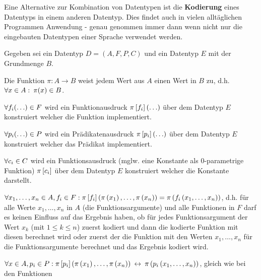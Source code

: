{\begin{comment}
\[\I{E}{\delta,\omega'}{nth(x,y)} = \ebr{}\]
Was das geforderte Ergebnis für diesen Fall ist.
\item Fall $\abs{\omega'(\tu{x})} \geq \omega'(\tu{y})$:
\[\I{E}{\delta,\omega'}{nth(x,y)} = \ell'_{\omega'(\tu{y})} = \ell'_{n} = \ell_{n+1}\]
Was ebenfalls das geforderte Ergebnis für diesen Fall ist.
\end{\whichitem}
\end{\whichitem}
Damit ist der Beweis erbracht. Wir stellen fest, dass Beweise von $\lng{E}$-Programmen oft kürzer sind als
die Interpretation für einen bestimmten Eingabewert.
\end{bsp}
\ifthenelse{\boolean{long}}{}{\end{comment}}

Eine Alternative zur Kombination von Datentypen ist die \textbf{Kodierung} eines Datentyps in einem anderen Datentyp.
Dies findet auch in vielen alltäglichen Programmen Anwendung - genau genommen immer dann wenn nicht nur die eingebauten Datentypen einer Sprache verwendet werden.

\begin{defn}
Gegeben sei ein Datentyp $D=(A,F,P,C)$ und ein Datentyp $E$ mit der Grundmenge $B$.
\begin{\whichitem}
\item Die Funktion $\pi: A \to B$ weist jedem Wert aus $A$ einen Wert in $B$ zu, d.h. $\text{$\forall$} x \in A: \: \pi(x) \in B$.
\item $\text{$\forall$} f_i(\ldots) \in F$ wird ein Funktionausdruck $\pi\left[f_i\right](\ldots)$ über dem Datentyp $E$ konstruiert welcher die Funktion implementiert.
\item $\text{$\forall$} p_i(\ldots) \in P$ wird ein Prädikatenausdruck $\pi\left[p_i\right](\ldots)$ über dem Datentyp $E$ konstruiert welcher das Prädikat implementiert.
\item $\text{$\forall$} c_i \in C$ wird ein Funktionsausdruck (mglw. eine Konstante als 0-parametrige Funktion) $\pi\left[c_i\right]$ über dem Datentyp $E$ konstruiert welcher die Konstante darstellt.
\end{\whichitem}
\end{defn}

\begin{defn}[Kodierungseigenschaften] \quad
\begin{\whichitem}
\item $\text{$\forall$} x_1,\ldots,x_n \in A, f_i \in F: \pi\left[f_i\right]\left(\pi\left(x_1\right),\ldots,\pi\left(x_n\right)\right) = \pi\left(f_i\left(x_1,\ldots,x_n\right)\right)$, d.h.
für alle Werte $x_1,\ldots,x_n$ in $A$ (die Funktionsargumente) und alle Funktionen in $F$ darf es keinen Einfluss auf das Ergebnis haben,
ob für jedes Funktionsargument der Wert $x_k$ (mit $1 \leq k \leq n$) zuerst kodiert und dann die kodierte Funktion mit diesen berechnet wird
oder zuerst der die Funktion mit den Werten $x_1,\ldots,x_n$ für die Funktionsargumente berechnet und das Ergebnis kodiert wird.
\item $\text{$\forall$} x \in A, p_i \in P: \pi\left[p_i\right]\left(\pi\left(x_1\right),\ldots,\pi\left(x_n\right)\right) \:\leftrightarrow\: \pi\left(p_i\left(x_1,\ldots,x_n\right)\right)$, gleich wie bei den Funktionen
\end{\whichitem}
\end{defn}

